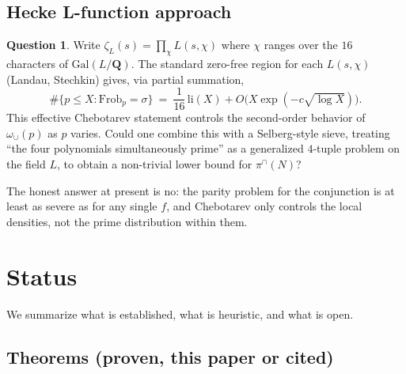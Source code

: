 \documentclass[11pt]{article}
\theoremstyle{definition}
\newtheorem{question}[theorem]{Question}
\newcommand{\Q}{\mathbf{Q}}
\begin{document}
\subsection{Hecke L-function approach}

\begin{question}\label{q:hecke}
Write $\zeta_L(s)=\prod_\chi L(s,\chi)$ where $\chi$ ranges over the $16$ characters of $\mathrm{Gal}(L/\Q)$. The standard zero-free region for each $L(s,\chi)$ (Landau, Stechkin) gives, via partial summation,
\[
\#\{p\le X : \mathrm{Frob}_p=\sigma\}\ =\ \frac{1}{16}\,\mathrm{li}(X) + O\bigl(X\exp(-c\sqrt{\log X})\bigr).
\]
This effective Chebotarev statement \cite[Lagarias-Odlyzko]{lagariasodlyzko} controls the second-order behavior of $\omega_\cup(p)$ as $p$ varies. Could one combine this with a Selberg-style sieve, treating ``the four polynomials simultaneously prime'' as a generalized $4$-tuple problem on the field $L$, to obtain a non-trivial lower bound for $\pi^\cap(N)$?

The honest answer at present is no: the parity problem for the conjunction is at least as severe as for any single $f$, and Chebotarev only controls the local densities, not the prime distribution within them.
\end{question}

\section{Status}\label{sec:status}

We summarize what is established, what is heuristic, and what is open.

\subsection{Theorems (proven, this paper or cited)}
\end{document}
